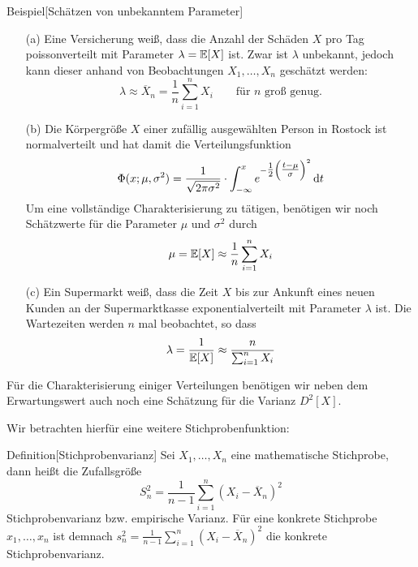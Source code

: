 \begin{colbox}{Beispiel}[Schätzen von unbekanntem Parameter]\label{bsp:schaetzungUnPara}
    \begin{enumerate}
        \item[(a)] Eine Versicherung weiß, dass die Anzahl der Schäden $X$ pro Tag poissonverteilt mit Parameter
        $\lambda=\mathbb E[X]$ ist. Zwar ist $\lambda$ unbekannt, jedoch kann dieser anhand von Beobachtungen $X_1,\dots,X_n$
        geschätzt werden:
        \[
            \lambda \approx \overline{X}_n = \dfrac{1}{n}\sum_{i=1}^{n} X_i \qquad\text{für } n \text{ groß genug.}
        \]
        \item[(b)] Die Körpergröße $X$ einer zufällig ausgewählten Person in Rostock ist normalverteilt und hat damit 
        die Verteilungsfunktion
        \[
            \Phi(x;\mu,\sigma^2) 
            = \dfrac{1}{\sqrt{2\pi\sigma^2}}
            \cdot\int_{-\infty}^{x}e^{-\tfrac{1}{2}\left(\tfrac{t-\mu}{\sigma}\right)^2}\mathop{}\!\mathrm{d} t
        \]
        Um eine vollständige Charakterisierung zu tätigen, benötigen wir noch Schätzwerte für die Parameter 
        $\mu$ und $\sigma^2$ durch 
        \[
            \mu = \mathbb E[X] \approx \dfrac{1}{n}\sum_{i=1}^{n} X_i
        \]
        \item[(c)] Ein Supermarkt weiß, dass die Zeit $X$ bis zur Ankunft eines neuen Kunden an der Supermarktkasse 
        exponentialverteilt mit Parameter $\lambda$ ist. Die Wartezeiten werden $n$ mal beobachtet, so dass 
        \[
            \lambda = \dfrac{1}{\mathbb E[X]} \approx \dfrac{n}{\sum_{i=1}^{n} X_i}
        \]
    \end{enumerate}
\end{colbox}

Für die Charakterisierung einiger Verteilungen benötigen wir neben dem Erwartungswert auch noch eine Schätzung für 
die Varianz $D^2[X]$.

Wir betrachten hierfür eine weitere Stichprobenfunktion:

\begin{colbox}{Definition}[Stichprobenvarianz]
    Sei $X_1,\dots,X_n$ eine mathematische Stichprobe, dann heißt die Zufallsgröße
    \[
        S_n^2 = \dfrac{1}{n-1} \sum_{i=1}^{n} (X_i-\overline{X}_n)^2
    \]
    Stichprobenvarianz bzw. empirische Varianz. Für eine konkrete Stichprobe $x_1,\dots,x_n$ ist demnach
    $s_n^2 = \tfrac{1}{n-1} \sum_{i=1}^{n} (X_i-\overline{X}_n)^2$ die konkrete Stichprobenvarianz.
\end{colbox}

